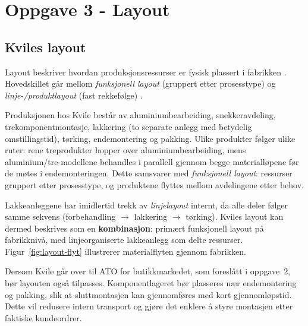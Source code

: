 \section*{Oppgave 3 - Layout}
\setcounter{section}{3}

\setcounter{subsection}{0}

\subsection{Kviles layout}

Layout beskriver hvordan produksjonsressurser er fysisk plassert i fabrikken \parencite{strandhagen2024}. Hovedskillet går mellom \textit{funksjonell layout} (gruppert etter prosesstype) og \textit{linje-/produktlayout} (fast rekkefølge) \parencite{slack2019}.

Produksjonen hos Kvile består av aluminiumbearbeiding, snekkeravdeling, trekomponentmontasje, lakkering (to separate anlegg med betydelig omstillingstid), tørking, endemontering og pakking. Ulike produkter følger ulike ruter: rene treprodukter hopper over aluminiumbearbeiding, mens aluminium/tre-modellene behandles i parallell gjennom begge materialløpene før de møtes i endemonteringen. Dette samsvarer med \textit{funksjonell layout}: ressurser gruppert etter prosesstype, og produktene flyttes mellom avdelingene etter behov.

Lakkeanleggene har imidlertid trekk av \textit{linjelayout} internt, da alle deler følger samme sekvens (forbehandling $\rightarrow$ lakkering $\rightarrow$ tørking). Kviles layout kan dermed beskrives som en \textbf{kombinasjon}: primært funksjonell layout på fabrikknivå, med linjeorganiserte lakkeanlegg som delte ressurser. Figur~\ref{fig:layout-flyt} illustrerer materialflyten gjennom fabrikken.

Dersom Kvile går over til ATO for butikkmarkedet, som foreslått i oppgave~2, bør layouten også tilpasses. Komponentlageret bør plasseres nær endemontering og pakking, slik at sluttmontasjen kan gjennomføres med kort gjennomløpstid. Dette vil redusere intern transport og gjøre det enklere å styre montasjen etter faktiske kundeordrer.

